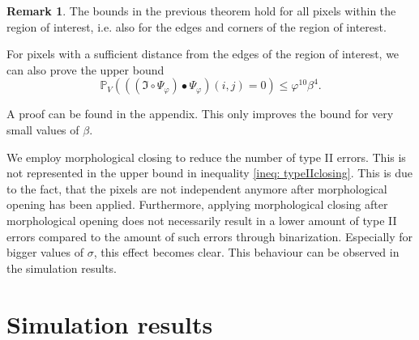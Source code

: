 \documentclass[a4paper,12pt]{article}
\theoremstyle{plain}
\theoremstyle{definition}
\newtheorem{remark}[theorem]{Remark}
\begin{document}
\begin{remark}
	The bounds in the previous theorem hold for all pixels within the region of interest, i.e. also for the edges and corners of the region of interest.
	
	For pixels with a sufficient distance from the edges of the region of interest, we can also prove the upper bound
	\begin{equation*}
		\mathbb{P}_V\left( ((\mathfrak{I} \circ \Psi_\varphi) \bullet \Psi_\varphi)(i, j) = 0 \right) \leq \varphi^{10} \beta^4.
	\end{equation*}
	
	A proof can be found in the appendix. This only improves the bound for very small values of $\beta$.
\end{remark}

We employ morphological closing to reduce the number of type II errors. This is not represented in the upper bound in inequality \eqref{ineq: typeIIclosing}. This is due to the fact, that the pixels are not independent anymore after morphological opening has been applied. Furthermore, applying morphological closing after morphological opening does not necessarily result in a lower amount of type II errors compared to the amount of such errors through binarization. Especially for bigger values of $\sigma$, this effect becomes clear. This behaviour can be observed in the simulation results.

\newpage

\section{Simulation results}\label{section: simulationresults}
\end{document}
